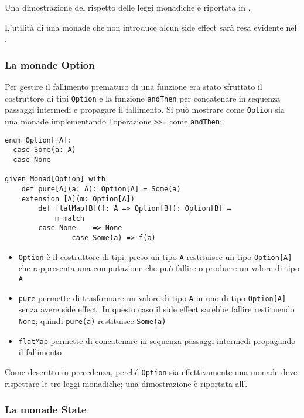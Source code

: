 Una dimostrazione del rispetto delle leggi monadiche è riportata in .

L'utilità di una monade che non introduce alcun side effect sarà resa evidente nel .

\subsubsection{La monade Option}
\label{la-monade-optional}
Per gestire il fallimento prematuro di una funzione era stato sfruttato il costruttore di tipi \lstinline{Option} e la funzione \lstinline{andThen} per concatenare in sequenza passaggi intermedi e propagare il fallimento.
Si può mostrare come \lstinline{Option} sia una monade implementando l'operazione \lstinline{>>=} come \lstinline{andThen}:
\begin{lstlisting}[language=scala3]
enum Option[+A]:
  case Some(a: A)
  case None

given Monad[Option] with
	def pure[A](a: A): Option[A] = Some(a)
	extension [A](m: Option[A]) 
		def flatMap[B](f: A => Option[B]): Option[B] =
			m match
        case None    => None
				case Some(a) => f(a)
\end{lstlisting}

\begin{itemize}
  \item \lstinline{Option} è il costruttore di tipi: preso un tipo \lstinline{A} restituisce un tipo \lstinline{Option[A]} che rappresenta una computazione che può fallire o produrre un valore di tipo \lstinline{A}
  \item \lstinline{pure} permette di trasformare un valore di tipo  \lstinline{A} in uno di tipo \lstinline{Option[A]} senza avere side effect. In questo caso il side effect sarebbe fallire restituendo \lstinline{None}; quindi \lstinline{pure(a)} restituisce \lstinline{Some(a)}
  \item \lstinline{flatMap} permette di concatenare in sequenza passaggi intermedi propagando il fallimento
\end{itemize}

Come descritto in precedenza, perché \lstinline{Option} sia effettivamente una monade deve rispettare le tre leggi monadiche; una dimostrazione è riportata all'.

\subsubsection{La monade State}
\label{la-monade-state}

